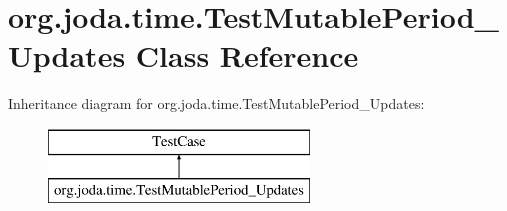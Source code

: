 \hypertarget{classorg_1_1joda_1_1time_1_1_test_mutable_period___updates}{\section{org.\-joda.\-time.\-Test\-Mutable\-Period\-\_\-\-Updates Class Reference}
\label{classorg_1_1joda_1_1time_1_1_test_mutable_period___updates}
}
Inheritance diagram for org.\-joda.\-time.\-Test\-Mutable\-Period\-\_\-\-Updates\-:\begin{figure}[H]
\begin{center}
\leavevmode
\includegraphics[height=2.000000cm]{classorg_1_1joda_1_1time_1_1_test_mutable_period___updates}
\end{center}
\end{figure}
